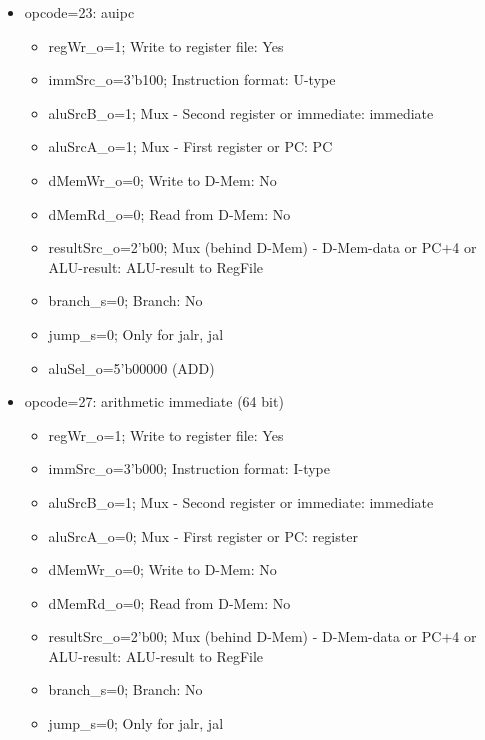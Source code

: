 \begin{itemize}
\begin{itemize}
\begin{itemize}
\begin{itemize}
        \item resultSrc\_o=2'b00; Mux (behind D-Mem) - D-Mem-data or PC+4 or ALU-result: ALU-result to RegFile
        \item branch\_s=0; Branch: No
        \item jump\_s=0; Only for jalr, jal
        \item aluSel\_o=various
      \end{itemize}
      \item opcode=23: auipc
      \begin{itemize}
        \item regWr\_o=1; Write to register file: Yes
        \item immSrc\_o=3'b100; Instruction format: U-type
        \item aluSrcB\_o=1; Mux - Second register or immediate: immediate
        \item aluSrcA\_o=1; Mux - First register or PC: PC
        \item dMemWr\_o=0; Write to D-Mem: No
        \item dMemRd\_o=0; Read from D-Mem: No
        \item resultSrc\_o=2'b00; Mux (behind D-Mem) - D-Mem-data or PC+4 or ALU-result: ALU-result to RegFile
        \item branch\_s=0; Branch: No
        \item jump\_s=0; Only for jalr, jal
        \item aluSel\_o=5'b00000 (ADD)
      \end{itemize}
      \item opcode=27: arithmetic immediate (64 bit)
      \begin{itemize}
        \item regWr\_o=1; Write to register file: Yes
        \item immSrc\_o=3'b000; Instruction format: I-type
        \item aluSrcB\_o=1; Mux - Second register or immediate: immediate
        \item aluSrcA\_o=0; Mux - First register or PC: register
        \item dMemWr\_o=0; Write to D-Mem: No
        \item dMemRd\_o=0; Read from D-Mem: No
        \item resultSrc\_o=2'b00; Mux (behind D-Mem) - D-Mem-data or PC+4 or ALU-result: ALU-result to RegFile
        \item branch\_s=0; Branch: No
        \item jump\_s=0; Only for jalr, jal

\end{itemize}
\end{itemize}
\end{itemize}
\end{itemize}
